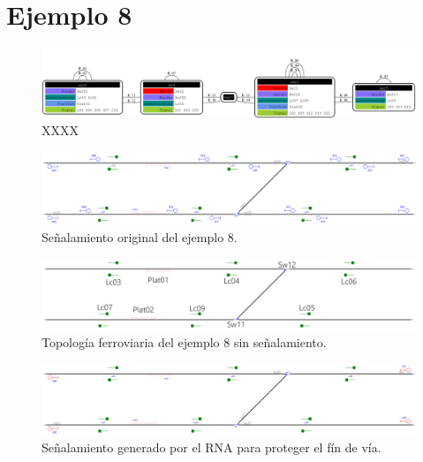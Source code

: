 \section{Ejemplo 8}

    \lipsum[1]
    
    \begin{figure}[h]
    	\centering
    	\includegraphics[width=1\textwidth]{Figuras/Graph_8}
    	\centering\caption{XXXX}
    \end{figure}
    
    \lipsum[1]

    \begin{figure}[h]
        \centering
        \includegraphics[width=1\textwidth]{resultados-obtenidos/ejemplo8/images/8_original.png}
        \centering\caption{Señalamiento original del ejemplo 8.}
    \end{figure}

    \begin{figure}[h]
        \centering
        \includegraphics[width=1\textwidth]{resultados-obtenidos/ejemplo8/images/8_empty.png}
        \centering\caption{Topología ferroviaria del ejemplo 8 sin señalamiento.}
    \end{figure}

    \begin{figure}[h]
        \centering
        \includegraphics[width=1\textwidth]{resultados-obtenidos/ejemplo8/images/8_step1.png}
        \centering\caption{Señalamiento generado por el RNA para proteger el fín de vía.}
    \end{figure}

